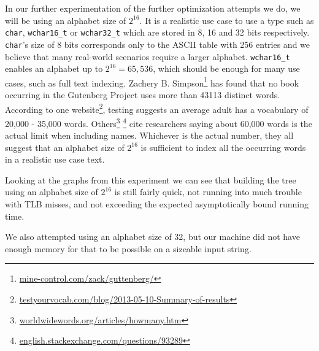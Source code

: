 In our further experimentation of the further optimization attempts we do, we will be using an alphabet size of $2^{16}$.
It is a realistic use case to use a type such as \texttt{char}, \texttt{wchar16\_t} or \texttt{wchar32\_t} which are stored in 8, 16 and 32 bits respectively.
\texttt{char}'s size of 8 bits corresponds only to the ASCII table with 256 entries and we believe that many real-world scenarios require a larger alphabet.
\texttt{wchar16\_t} enables an alphabet up to $2^{16} = 65,536$, which should be enough for many use cases, such as full text indexing.
Zachery B. Simpson\footnote{\url{mine-control.com/zack/guttenberg/}} has found that no book occurring in the Gutenberg Project uses more than 43113 distinct words.
According to one website\footnote{\url{testyourvocab.com/blog/2013-05-10-Summary-of-results}}, testing suggests an average adult has a vocabulary of 20,000 - 35,000 words. 
Others\footnote{\url{worldwidewords.org/articles/howmany.htm}} \footnote{\url{english.stackexchange.com/questions/93289}} cite researchers saying about 60,000 words is the actual limit when including names.
Whichever is the actual number, they all suggest that an alphabet size of $2^{16}$ is sufficient to index all the occurring words in a realistic use case text.

Looking at the graphs from this experiment we can see that building the tree using an alphabet size of $2^{16}$ is still fairly quick, not running into much trouble with TLB misses, and not exceeding the expected asymptotically bound running time.

We also attempted using an alphabet size of 32, but our machine did not have enough memory for that to be possible on a sizeable input string.



